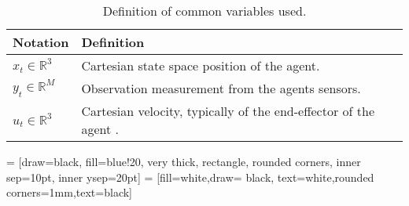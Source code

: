 

\begin{table}
\begin{center}
\renewcommand{\arraystretch}{1.5}
\begin{tabular}{ l|l} 
\hline
    \textbf{Notation} 		& \textbf{Definition} \\ \hline\hline
    $x_t \in \mathbb{R}^3$ 	& Cartesian state space position of the agent.\\
    $y_t \in \mathbb{R}^{M}$	& Observation measurement from the agents sensors.\\
    $u_t \in \mathbb{R}^3$	& Cartesian velocity, typically of the end-effector of the agent .\\
\end{tabular}
\end{center}
\caption{Definition of common variables used.}
\label{tab:notation}
\end{table}

  = [draw=black, fill=blue!20, very thick,  rectangle, rounded corners, inner sep=10pt, inner ysep=20pt]
 = [fill=white,draw= black, text=white,rounded corners=1mm,text=black]

